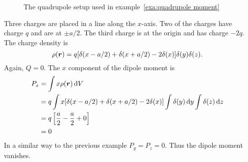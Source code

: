     \begin{example}\label{exa:quadrupole moment}
        \begin{figure}[ht]
            \centering
            \caption{The quadrupole setup used in example~\ref{exa:quadrupole moment}}
        \end{figure}
        Three charges are placed in a line along the \(x\)-axis.
        Two of the charges have charge \(q\) and are at \(\pm a/2\).
        The third charge is at the origin and has charge \(-2q\).
        The charge density is
        \[\rho(\bm{r}) = q[\delta(x - a/2) + \delta(x + a/2) - 2\delta(x)]\delta(y)\delta(z).\]
        Again, \(Q = 0\).
        The \(x\) component of the dipole moment is
        \begin{align*}
            P_x &= \int x\rho(\bm{r})\dd{V}\\
            &= q\int x[\delta(x - a/2) + \delta(x + a/2) - 2\delta(x)]\int\delta(y)\dd{y}\int\delta(z)\dd{z}\\
            &= q\left[\frac{a}{2} - \frac{a}{2} + 0\right]\\
            &= 0
        \end{align*}
        In a similar way to the previous example \(P_y = P_z = 0\).
        Thus the dipole moment vanishes.
        

\end{example}
